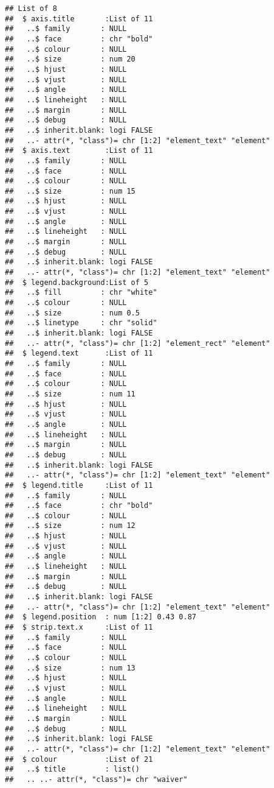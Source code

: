 \documentclass[
]{article}
\begin{document}
\begin{verbatim}
## List of 8
##  $ axis.title       :List of 11
##   ..$ family       : NULL
##   ..$ face         : chr "bold"
##   ..$ colour       : NULL
##   ..$ size         : num 20
##   ..$ hjust        : NULL
##   ..$ vjust        : NULL
##   ..$ angle        : NULL
##   ..$ lineheight   : NULL
##   ..$ margin       : NULL
##   ..$ debug        : NULL
##   ..$ inherit.blank: logi FALSE
##   ..- attr(*, "class")= chr [1:2] "element_text" "element"
##  $ axis.text        :List of 11
##   ..$ family       : NULL
##   ..$ face         : NULL
##   ..$ colour       : NULL
##   ..$ size         : num 15
##   ..$ hjust        : NULL
##   ..$ vjust        : NULL
##   ..$ angle        : NULL
##   ..$ lineheight   : NULL
##   ..$ margin       : NULL
##   ..$ debug        : NULL
##   ..$ inherit.blank: logi FALSE
##   ..- attr(*, "class")= chr [1:2] "element_text" "element"
##  $ legend.background:List of 5
##   ..$ fill         : chr "white"
##   ..$ colour       : NULL
##   ..$ size         : num 0.5
##   ..$ linetype     : chr "solid"
##   ..$ inherit.blank: logi FALSE
##   ..- attr(*, "class")= chr [1:2] "element_rect" "element"
##  $ legend.text      :List of 11
##   ..$ family       : NULL
##   ..$ face         : NULL
##   ..$ colour       : NULL
##   ..$ size         : num 11
##   ..$ hjust        : NULL
##   ..$ vjust        : NULL
##   ..$ angle        : NULL
##   ..$ lineheight   : NULL
##   ..$ margin       : NULL
##   ..$ debug        : NULL
##   ..$ inherit.blank: logi FALSE
##   ..- attr(*, "class")= chr [1:2] "element_text" "element"
##  $ legend.title     :List of 11
##   ..$ family       : NULL
##   ..$ face         : chr "bold"
##   ..$ colour       : NULL
##   ..$ size         : num 12
##   ..$ hjust        : NULL
##   ..$ vjust        : NULL
##   ..$ angle        : NULL
##   ..$ lineheight   : NULL
##   ..$ margin       : NULL
##   ..$ debug        : NULL
##   ..$ inherit.blank: logi FALSE
##   ..- attr(*, "class")= chr [1:2] "element_text" "element"
##  $ legend.position  : num [1:2] 0.43 0.87
##  $ strip.text.x     :List of 11
##   ..$ family       : NULL
##   ..$ face         : NULL
##   ..$ colour       : NULL
##   ..$ size         : num 13
##   ..$ hjust        : NULL
##   ..$ vjust        : NULL
##   ..$ angle        : NULL
##   ..$ lineheight   : NULL
##   ..$ margin       : NULL
##   ..$ debug        : NULL
##   ..$ inherit.blank: logi FALSE
##   ..- attr(*, "class")= chr [1:2] "element_text" "element"
##  $ colour           :List of 21
##   ..$ title         : list()
##   .. ..- attr(*, "class")= chr "waiver"

\end{verbatim}
\end{document}
